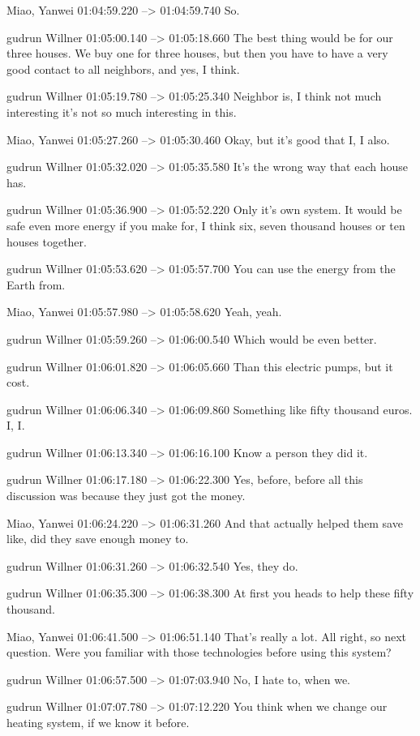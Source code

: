 {Miao, Yanwei 01:04:59.220 --> 01:04:59.740
So.

gudrun Willner 01:05:00.140 --> 01:05:18.660
The best thing would be for our three houses. We buy one for three houses, but then you have to have a very good contact to all neighbors, and yes, I think.

gudrun Willner 01:05:19.780 --> 01:05:25.340
Neighbor is, I think not much interesting it's not so much interesting in this.

Miao, Yanwei 01:05:27.260 --> 01:05:30.460
Okay, but it's good that I, I also.

gudrun Willner 01:05:32.020 --> 01:05:35.580
It's the wrong way that each house has.

gudrun Willner 01:05:36.900 --> 01:05:52.220
Only it's own system. It would be safe even more energy if you make for, I think six, seven thousand houses or ten houses together.

gudrun Willner 01:05:53.620 --> 01:05:57.700
You can use the energy from the Earth from.

Miao, Yanwei 01:05:57.980 --> 01:05:58.620
Yeah, yeah.

gudrun Willner 01:05:59.260 --> 01:06:00.540
Which would be even better.

gudrun Willner 01:06:01.820 --> 01:06:05.660
Than this electric pumps, but it cost.

gudrun Willner 01:06:06.340 --> 01:06:09.860
Something like fifty thousand euros. I, I.

gudrun Willner 01:06:13.340 --> 01:06:16.100
Know a person they did it.

gudrun Willner 01:06:17.180 --> 01:06:22.300
Yes, before, before all this discussion was because they just got the money.

Miao, Yanwei 01:06:24.220 --> 01:06:31.260
And that actually helped them save like, did they save enough money to.

gudrun Willner 01:06:31.260 --> 01:06:32.540
Yes, they do.

gudrun Willner 01:06:35.300 --> 01:06:38.300
At first you heads to help these fifty thousand.

Miao, Yanwei 01:06:41.500 --> 01:06:51.140
That's really a lot. All right, so next question. Were you familiar with those technologies before using this system?

gudrun Willner 01:06:57.500 --> 01:07:03.940
No, I hate to, when we.

gudrun Willner 01:07:07.780 --> 01:07:12.220
You think when we change our heating system, if we know it before.

}
